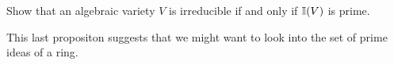 \documentclass{ximera}
\begin{document}
\begin{proposition}%
  Show that an algebraic variety $V$ is irreducible if and only if
  $\mathbb I(V)$ is prime.
    
\end{proposition}










This last propositon suggests that we might want to look into the set
of prime ideas of a ring.
\end{document}
